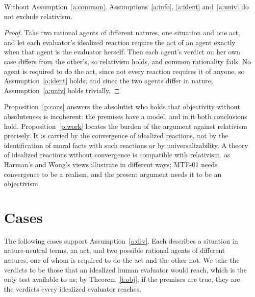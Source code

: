 \documentclass{situationist-preprint}
\begin{document}
\begin{proposition}\label{p:work}
Without Assumption~\ref{a:common}, Assumptions~\ref{a:info}, \ref{a:ident} and~\ref{a:univ} do not exclude relativism.
\end{proposition}

\begin{proof}
Take two rational agents of different natures, one situation and one act, and let each evaluator's idealized reaction require the act of an agent exactly when that agent is the evaluator herself. Then each agent's verdict on her own case differs from the other's, so relativism holds, and common rationality fails. No agent is required to do the act, since not every reaction requires it of anyone, so Assumption~\ref{a:ident} holds; and since the two agents differ in nature, Assumption~\ref{a:univ} holds trivially.
\end{proof}

Proposition~\ref{p:cons} answers the absolutist who holds that objectivity without absoluteness is incoherent: the premises have a model, and in it both conclusions hold. Proposition~\ref{p:work} locates the burden of the argument against relativism precisely. It is carried by the convergence of idealized reactions, not by the identification of moral facts with such reactions or by universalizability. A theory of idealized reactions without convergence is compatible with relativism, as Harman's and Wong's views illustrate in different ways; MTE-01 needs convergence to be a realism, and the present argument needs it to be an objectivism.

\section{Cases}\label{s:cases}

The following cases support Assumption~\ref{a:div}. Each describes a situation in nature-neutral terms, an act, and two possible rational agents of different natures, one of whom is required to do the act and the other not. We take the verdicts to be those that an idealized human evaluator would reach, which is the only test available to us; by Theorem~\ref{t:obj}, if the premises are true, they are the verdicts every idealized evaluator reaches.
\end{document}
